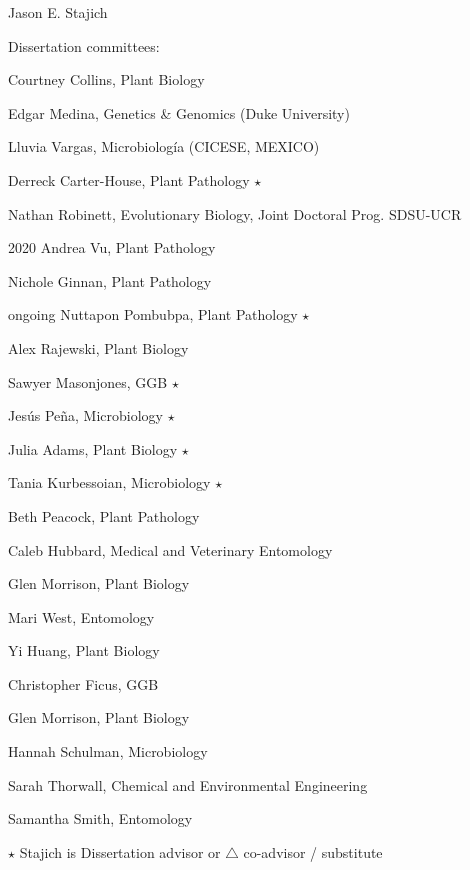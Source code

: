 \documentclass[10pt]{article}
\begin{document}
\begin{cv}{\centerline{Jason E. Stajich}}
\begin{cvlistcompact}{Dissertation committees:}
\item Courtney Collins, Plant Biology
\item Edgar Medina, Genetics \& Genomics (Duke University)
\item Lluvia Vargas, Microbiolog\'{i}a (CICESE, MEXICO)
\item Derreck Carter-House, Plant Pathology $\star$
\item Nathan Robinett, Evolutionary Biology, Joint Doctoral Prog. SDSU-UCR
\item [2020] Andrea Vu, Plant Pathology
\item Nichole Ginnan, Plant Pathology
\item [ongoing] Nuttapon Pombubpa, Plant Pathology $\star$
\item Alex Rajewski, Plant Biology
\item Sawyer Masonjones, GGB $\star$
\item Jes\'{u}s Pe\~{n}a, Microbiology $\star$
\item Julia Adams, Plant Biology $\star$
\item Tania Kurbessoian, Microbiology $\star$
\item Beth Peacock, Plant Pathology
\item Caleb Hubbard, Medical and Veterinary Entomology
\item Glen Morrison, Plant Biology
\item Mari West, Entomology
\item Yi Huang, Plant Biology
\item Christopher Ficus, GGB
\item Glen Morrison, Plant Biology
\item Hannah Schulman, Microbiology
\item Sarah Thorwall, Chemical and Environmental Engineering
\item Samantha Smith, Entomology
\end{cvlistcompact}
$\star$ Stajich is Dissertation advisor or $\triangle$ co-advisor / substitute



\end{cv}
\end{document}
